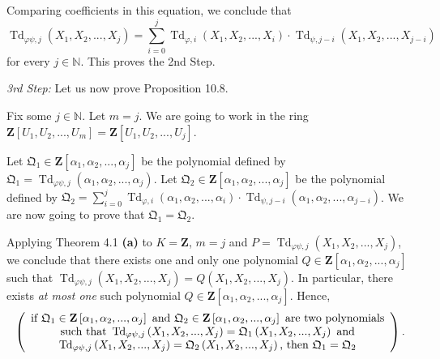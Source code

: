 \documentclass[numbers=enddot,12pt,final,onecolumn,notitlepage]{scrartcl}%
\begin{document}
Comparing coefficients in this equation, we conclude that%
\[
\operatorname*{Td}\nolimits_{\varphi\psi,j}\left(  X_{1},X_{2},...,X_{j}%
\right)  =\sum_{i=0}^{j}\operatorname*{Td}\nolimits_{\varphi,i}\left(
X_{1},X_{2},...,X_{i}\right)  \cdot\operatorname*{Td}\nolimits_{\psi
,j-i}\left(  X_{1},X_{2},...,X_{j-i}\right)
\]
for every $j\in\mathbb{N}$. This proves the 2nd Step.

\textit{3rd Step:} Let us now prove Proposition 10.8.

Fix some $j\in\mathbb{N}$. Let $m=j$. We are going to work in the ring
$\mathbf{Z}\left[  U_{1},U_{2},...,U_{m}\right]  =\mathbf{Z}\left[
U_{1},U_{2},...,U_{j}\right]  $.

Let $\mathfrak{Q}_{1}\in\mathbf{Z}\left[  \alpha_{1},\alpha_{2},...,\alpha
_{j}\right]  $ be the polynomial defined by $\mathfrak{Q}_{1}%
=\operatorname*{Td}\nolimits_{\varphi\psi,j}\left(  \alpha_{1},\alpha
_{2},...,\alpha_{j}\right)  $. Let $\mathfrak{Q}_{2}\in\mathbf{Z}\left[
\alpha_{1},\alpha_{2},...,\alpha_{j}\right]  $ be the polynomial defined by
$\mathfrak{Q}_{2}=\sum\limits_{i=0}^{j}\operatorname*{Td}\nolimits_{\varphi
,i}\left(  \alpha_{1},\alpha_{2},...,\alpha_{i}\right)  \cdot
\operatorname*{Td}\nolimits_{\psi,j-i}\left(  \alpha_{1},\alpha_{2}%
,...,\alpha_{j-i}\right)  $. We are now going to prove that $\mathfrak{Q}%
_{1}=\mathfrak{Q}_{2}$.

Applying Theorem 4.1 \textbf{(a)} to $K=\mathbf{Z}$, $m=j$ and
$P=\operatorname*{Td}\nolimits_{\varphi\psi,j}\left(  X_{1},X_{2}%
,...,X_{j}\right)  $, we conclude that there exists one and only one
polynomial $Q\in\mathbf{Z}\left[  \alpha_{1},\alpha_{2},...,\alpha_{j}\right]
$ such that $\operatorname*{Td}\nolimits_{\varphi\psi,j}\left(  X_{1}%
,X_{2},...,X_{j}\right)  =Q\left(  X_{1},X_{2},...,X_{j}\right)  $. In
particular, there exists \textit{at most one} such polynomial $Q\in
\mathbf{Z}\left[  \alpha_{1},\alpha_{2},...,\alpha_{j}\right]  $. Hence,
\begin{equation}
\left(
\begin{array}
[c]{c}%
\text{if }\mathfrak{Q}_{1}\in\mathbf{Z}\left[  \alpha_{1},\alpha
_{2},...,\alpha_{j}\right]  \text{ and }\mathfrak{Q}_{2}\in\mathbf{Z}\left[
\alpha_{1},\alpha_{2},...,\alpha_{j}\right]  \text{ are two polynomials}\\
\text{such that }\operatorname*{Td}\nolimits_{\varphi\psi,j}\left(
X_{1},X_{2},...,X_{j}\right)  =\mathfrak{Q}_{1}\left(  X_{1},X_{2}%
,...,X_{j}\right)  \text{ and}\\
\operatorname*{Td}\nolimits_{\varphi\psi,j}\left(  X_{1},X_{2},...,X_{j}%
\right)  =\mathfrak{Q}_{2}\left(  X_{1},X_{2},...,X_{j}\right)  \text{, then
}\mathfrak{Q}_{1}=\mathfrak{Q}_{2}%
\end{array}
\right)  . \label{10.8.pf.2}%
\end{equation}
\end{document}
